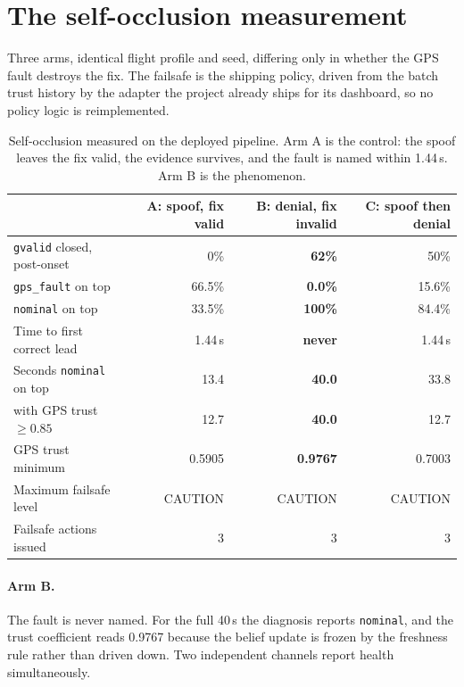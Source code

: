 \documentclass[11pt,a4paper]{article}
\newcommand{\code}[1]{\texttt{\small #1}}
\begin{document}
\section{The self-occlusion measurement}
\label{sec:measurement}

Three arms, identical flight profile and seed, differing only in whether the
GPS fault destroys the fix. The failsafe is the shipping policy, driven from
the batch trust history by the adapter the project already ships for its
dashboard, so no policy logic is reimplemented.

\begin{table}[h]
\centering
\small
\begin{tabular}{lrrr}
\toprule
& A: spoof, fix valid & B: denial, fix invalid & C: spoof then denial \\
\midrule
\code{gvalid} closed, post-onset & 0\% & \textbf{62\%} & 50\% \\
\code{gps\_fault} on top & 66.5\% & \textbf{0.0\%} & 15.6\% \\
\code{nominal} on top & 33.5\% & \textbf{100\%} & 84.4\% \\
Time to first correct lead & 1.44\,s & \textbf{never} & 1.44\,s \\
Seconds \code{nominal} on top & 13.4 & \textbf{40.0} & 33.8 \\
\quad with GPS trust $\ge 0.85$ & 12.7 & \textbf{40.0} & 12.7 \\
GPS trust minimum & 0.5905 & \textbf{0.9767} & 0.7003 \\
Maximum failsafe level & CAUTION & CAUTION & CAUTION \\
Failsafe actions issued & 3 & 3 & 3 \\
\bottomrule
\end{tabular}
\caption{Self-occlusion measured on the deployed pipeline. Arm A is the
control: the spoof leaves the fix valid, the evidence survives, and the fault
is named within 1.44\,s. Arm B is the phenomenon.}
\label{tab:arms}
\end{table}

\paragraph{Arm B.} The fault is never named. For the full 40\,s the diagnosis
reports \code{nominal}, and the trust coefficient reads 0.9767 because the
belief update is frozen by the freshness rule rather than driven down. Two
independent channels report health simultaneously.
\end{document}
